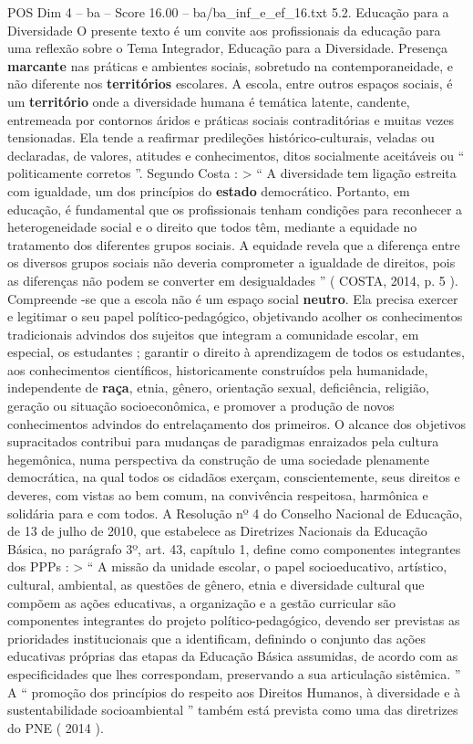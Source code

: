 \begin{textsample}{POS Dim 4 – ba – Score 16.00 – ba/ba\_inf\_e\_ef\_16.txt}  \label{ex:f4_pos_025}
5.2.
Educação para a Diversidade O presente texto é um convite aos profissionais da educação para uma reflexão sobre o Tema Integrador, Educação para a Diversidade.
Presença \textbf{marcante} nas práticas e ambientes sociais, sobretudo na contemporaneidade, e não diferente nos \textbf{territórios} escolares.
A escola, entre outros espaços sociais, é um \textbf{território} onde a diversidade humana é temática latente, candente, entremeada por contornos áridos e práticas sociais contraditórias e muitas vezes tensionadas.
Ela tende a reafirmar predileções histórico-culturais, veladas ou declaradas, de valores, atitudes e conhecimentos, ditos socialmente aceitáveis ou “ politicamente corretos ”.
Segundo Costa : > “ A diversidade tem ligação estreita com igualdade, um dos princípios do \textbf{estado} democrático.
Portanto, em educação, é fundamental que os profissionais tenham condições para reconhecer a heterogeneidade social e o direito que todos têm, mediante a equidade no tratamento dos diferentes grupos sociais.
A equidade revela que a diferença entre os diversos grupos sociais não deveria comprometer a igualdade de direitos, pois as diferenças não podem se converter em desigualdades ” ( COSTA, 2014, p. 5 ).
Compreende -se que a escola não é um espaço social \textbf{neutro}.
Ela precisa exercer e legitimar o seu papel político-pedagógico, objetivando acolher os conhecimentos tradicionais advindos dos sujeitos que integram a comunidade escolar, em especial, os estudantes ; garantir o direito à aprendizagem de todos os estudantes, aos conhecimentos científicos, historicamente construídos pela humanidade, independente de \textbf{raça}, etnia, gênero, orientação sexual, deficiência, religião, geração ou situação socioeconômica, e promover a produção de novos conhecimentos advindos do entrelaçamento dos primeiros.
O alcance dos objetivos supracitados contribui para mudanças de paradigmas enraizados pela cultura hegemônica, numa perspectiva da construção de uma sociedade plenamente democrática, na qual todos os cidadãos exerçam, conscientemente, seus direitos e deveres, com vistas ao bem comum, na convivência respeitosa, harmônica e solidária para e com todos.
A Resolução nº 4 do Conselho Nacional de Educação, de 13 de julho de 2010, que estabelece as Diretrizes Nacionais da Educação Básica, no parágrafo 3º, art. 43, capítulo 1, define como componentes integrantes dos PPPs : > “ A missão da unidade escolar, o papel socioeducativo, artístico, cultural, ambiental, as questões de gênero, etnia e diversidade cultural que compõem as ações educativas, a organização e a gestão curricular são componentes integrantes do projeto político-pedagógico, devendo ser previstas as prioridades institucionais que a identificam, definindo o conjunto das ações educativas próprias das etapas da Educação Básica assumidas, de acordo com as especificidades que lhes correspondam, preservando a sua articulação sistêmica. ” A “ promoção dos princípios do respeito aos Direitos Humanos, à diversidade e à sustentabilidade socioambiental ” também está prevista como uma das diretrizes do PNE ( 2014 ).

\end{textsample}
